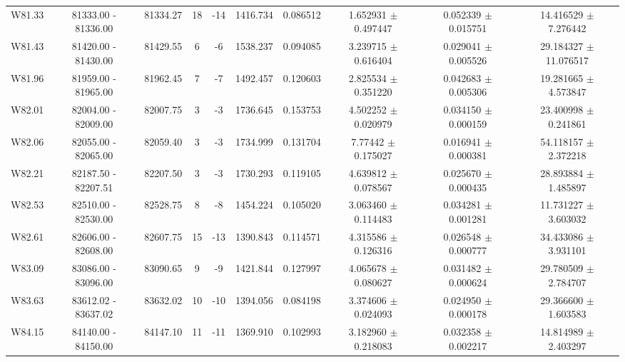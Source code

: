 \documentclass{article}
\begin{document}
\begin{table}[h]
{\begin{tabular}{|c|c|c|c|c|c|c|c|c|c|}
W81.33 & 81333.00 - 81336.00 & 81334.27 & 18 & -14 & 1416.734 & 0.086512 & 1.652931 $\pm$ 0.497447 & 0.052339 $\pm$ 0.015751 & 14.416529 $\pm$ 7.276442 \\

W81.43 & 81420.00 - 81430.00 & 81429.55 & 6 & -6 & 1538.237 & 0.094085 & 3.239715 $\pm$ 0.616404 & 0.029041 $\pm$ 0.005526 & 29.184327 $\pm$ 11.076517 \\

W81.96 & 81959.00 - 81965.00 & 81962.45 & 7 & -7 & 1492.457 & 0.120603 & 2.825534 $\pm$ 0.351220 & 0.042683 $\pm$ 0.005306 & 19.281665 $\pm$ 4.573847 \\

W82.01 & 82004.00 - 82009.00 & 82007.75 & 3 & -3 & 1736.645 & 0.153753 & 4.502252 $\pm$ 0.020979 &  0.034150 $\pm$ 0.000159 & 23.400998 $\pm$ 0.241861 \\

W82.06 & 82055.00 - 82065.00 & 82059.40 & 3 & -3 & 1734.999 & 0.131704 & 7.77442 $\pm$ 0.175027 & 0.016941 $\pm$ 0.000381 & 54.118157 $\pm$ 2.372218 \\

W82.21 & 82187.50 - 82207.51 & 82207.50 & 3 & -3 & 1730.293 & 0.119105 & 4.639812 $\pm$ 0.078567 &  0.025670 $\pm$ 0.000435 & 28.893884 $\pm$ 1.485897 \\
         
W82.53 & 82510.00 - 82530.00 & 82528.75 & 8 & -8 & 1454.224 & 0.105020 & 3.063460 $\pm$ 0.114483 & 0.034281 $\pm$ 0.001281 & 11.731227 $\pm$ 3.603032 \\

W82.61 & 82606.00 - 82608.00 & 82607.75 & 15 & -13 & 1390.843 & 0.114571 & 4.315586 $\pm$ 0.126316 & 0.026548 $\pm$ 0.000777 & 34.433086 $\pm$ 3.931101 \\
         
W83.09 & 83086.00 - 83096.00 & 83090.65 & 9 & -9 & 1421.844 & 0.127997 & 4.065678 $\pm$ 0.080627 & 0.031482 $\pm$ 0.000624 & 29.780509 $\pm$ 2.784707 \\
         
W83.63 & 83612.02 - 83637.02 & 83632.02 & 10 & -10 & 1394.056 & 0.084198 & 3.374606 $\pm$ 0.024093 &  0.024950 $\pm$ 0.000178 & 29.366600 $\pm$ 1.603583 \\
         
W84.15 & 84140.00 - 84150.00 & 84147.10 & 11 & -11 & 1369.910 & 0.102993 & 3.182960 $\pm$ 0.218083 & 0.032358 $\pm$ 0.002217 & 14.814989 $\pm$ 2.403297 \\
         

\end{tabular}}
\end{table}
\end{document}
